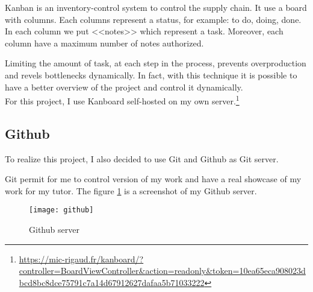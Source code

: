 Kanban is an inventory-control system to control the supply chain. It use a
board with columns. Each columns represent a status, for example: to do, doing,
done. In each column we put <<notes>> which represent a task. Moreover, each
column have a maximum number of notes authorized.



Limiting the amount of task, at each step in the process, prevents
overproduction and revels bottlenecks dynamically. In fact, with this technique
it is possible to have a better overview of the project and control it dynamically.
~\\

For this project, I use Kanboard\cite{guillot:kanboard} self-hosted on my own server.\footnote{\url{https://mic-rigaud.fr/kanboard/?controller=BoardViewController&action=readonly&token=10ea65eca908023dbcd8bc8dce75791c7a14d67912627dafaa5b71033222}}


\subsection{Github}

To realize this project, I also decided to use Git and Github as Git server. ~\\


Git permit for me to control version of my work and have a real showcase of my
work for my tutor. The figure \ref{fig:github} is a screenshot of my Github
server.

\begin{figure}[h]
  \centering
  \texttt{[image: github]}
  \caption{Github server}
  \label{fig:github}
\end{figure}




